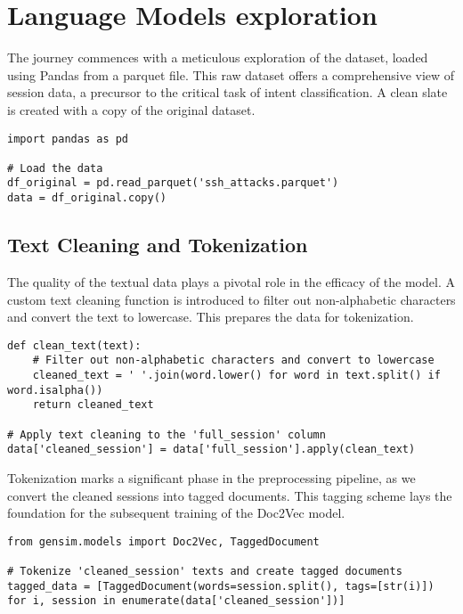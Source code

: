 \section{Language Models exploration} \label{Language Models exploration}

The journey commences with a meticulous exploration of the dataset, loaded using Pandas from a parquet file. This raw dataset offers a comprehensive view of session data, a precursor to the critical task of intent classification. A clean slate is created with a copy of the original dataset.

\begin{lstlisting}
import pandas as pd

# Load the data
df_original = pd.read_parquet('ssh_attacks.parquet')
data = df_original.copy()
\end{lstlisting}

\subsection{Text Cleaning and Tokenization}
The quality of the textual data plays a pivotal role in the efficacy of the model. A custom text cleaning function is introduced to filter out non-alphabetic characters and convert the text to lowercase. This prepares the data for tokenization.

\begin{lstlisting}
def clean_text(text):
    # Filter out non-alphabetic characters and convert to lowercase
    cleaned_text = ' '.join(word.lower() for word in text.split() if word.isalpha())
    return cleaned_text

# Apply text cleaning to the 'full_session' column
data['cleaned_session'] = data['full_session'].apply(clean_text)
\end{lstlisting}

Tokenization marks a significant phase in the preprocessing pipeline, as we convert the cleaned sessions into tagged documents. This tagging scheme lays the foundation for the subsequent training of the Doc2Vec model.

\begin{lstlisting}
from gensim.models import Doc2Vec, TaggedDocument

# Tokenize 'cleaned_session' texts and create tagged documents
tagged_data = [TaggedDocument(words=session.split(), tags=[str(i)]) for i, session in enumerate(data['cleaned_session'])]
\end{lstlisting}

